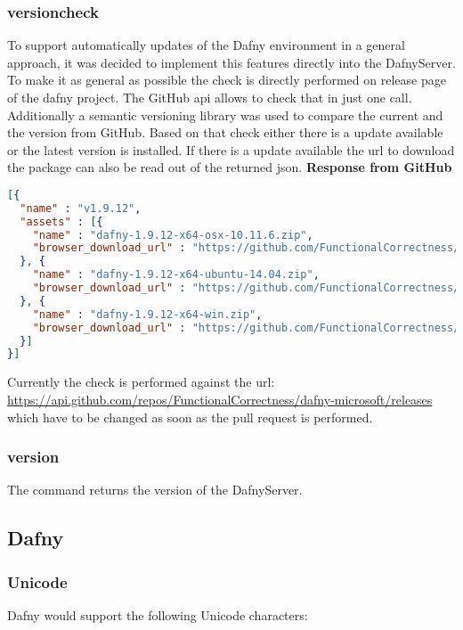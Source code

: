 \subsubsection{versioncheck}
To support automatically updates of the Dafny environment in a general approach, it was decided to implement this features directly into the DafnyServer. To make it as general as possible the check is directly performed on release page of the dafny project. The GitHub api allows to check that in just one call. Additionally a semantic versioning library\cite{semver} was used to compare the current and the version from GitHub. Based on that check either there is a update available or the latest version is installed. If there is a update available the url to download the package can also be read out of the returned json. 
\newline
\textbf{Response from GitHub}
\begin{lstlisting}[language=json,firstnumber=1]
[{
  "name" : "v1.9.12",
  "assets" : [{
    "name" : "dafny-1.9.12-x64-osx-10.11.6.zip",
    "browser_download_url" : "https://github.com/FunctionalCorrectness/dafny-microsoft/releases/download/v1.9.12/dafny-1.9.12-x64-osx-10.11.6.zip"
  }, {
    "name" : "dafny-1.9.12-x64-ubuntu-14.04.zip",
    "browser_download_url" : "https://github.com/FunctionalCorrectness/dafny-microsoft/releases/download/v1.9.12/dafny-1.9.12-x64-ubuntu-14.04.zip"
  }, {
    "name" : "dafny-1.9.12-x64-win.zip",
    "browser_download_url" : "https://github.com/FunctionalCorrectness/dafny-microsoft/releases/download/v1.9.12/dafny-1.9.12-x64-win.zip"
  }]
}]
\end{lstlisting}

Currently the check is performed against the url:  \href{https://api.github.com/repos/FunctionalCorrectness/dafny-microsoft/releases}{https://api.github.com/repos/FunctionalCorrectness/dafny-microsoft/releases} which have to be changed as soon as the pull request is performed. 


\subsubsection{version}
The command returns the version of the DafnyServer.  


\subsection{Dafny}

\subsubsection{Unicode}
Dafny would support the following Unicode characters: 

